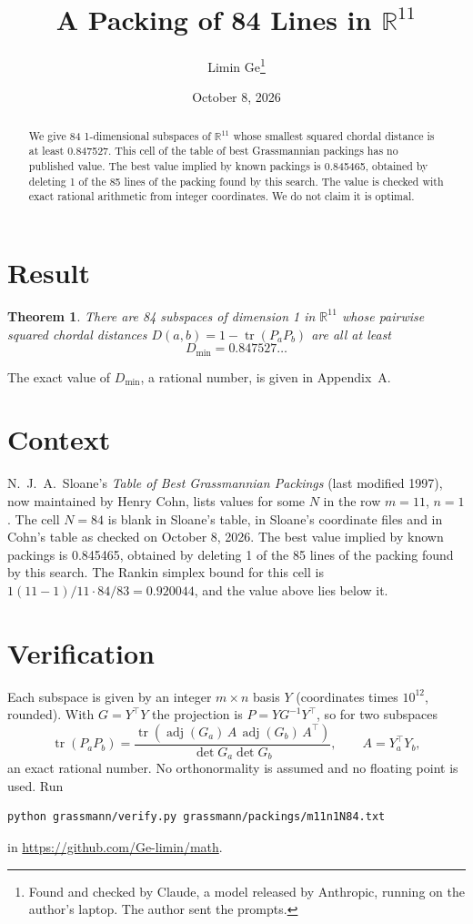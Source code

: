 \documentclass[11pt,a4paper]{article}
\title{A Packing of 84 Lines in $\mathbb{R}^{11}$}
\author{Limin Ge\thanks{Found and checked by Claude, a model released by Anthropic, running on the author's laptop. The author sent the prompts.}}
\date{October 8, 2026}
\newtheorem*{theorem}{Theorem}
\begin{document}
\maketitle
\begin{abstract}
We give 84 1-dimensional subspaces of $\mathbb{R}^{11}$ whose smallest squared chordal distance is at least 0.847527. This cell of the table of best Grassmannian packings has no published value. The best value implied by known packings is 0.845465, obtained by deleting 1 of the 85 lines of the packing found by this search. The value is checked with exact rational arithmetic from integer coordinates. We do not claim it is optimal.
\end{abstract}

\section{Result}
\begin{theorem}
There are 84 subspaces of dimension 1 in $\mathbb{R}^{11}$ whose pairwise squared chordal distances $D(a,b) = 1 - \operatorname{tr}(P_aP_b)$ are all at least
\[ D_{\min} = 0.847527\ldots \]
\end{theorem}
The exact value of $D_{\min}$, a rational number, is given in Appendix~A.


\section{Context}
N.~J.~A.~Sloane's \emph{Table of Best Grassmannian Packings} (last modified 1997), now maintained by Henry Cohn, lists values for some $N$ in the row $m=11$, $n=1$. The cell $N=84$ is blank in Sloane's table, in Sloane's coordinate files and in Cohn's table as checked on October 8, 2026. The best value implied by known packings is 0.845465, obtained by deleting 1 of the 85 lines of the packing found by this search. The Rankin simplex bound for this cell is $1(11-1)/11\cdot 84/83 = 0.920044$, and the value above lies below it.


\section{Verification}
Each subspace is given by an integer $m\times n$ basis $Y$ (coordinates times $10^{12}$, rounded). With $G=Y^\top Y$ the projection is $P=YG^{-1}Y^\top$, so for two subspaces
\[ \operatorname{tr}(P_aP_b)=\frac{\operatorname{tr}(\operatorname{adj}(G_a)\,A\,\operatorname{adj}(G_b)\,A^\top)}{\det G_a\det G_b},\qquad A=Y_a^\top Y_b, \]
an exact rational number. No orthonormality is assumed and no floating point is used. Run
\begin{verbatim}
python grassmann/verify.py grassmann/packings/m11n1N84.txt
\end{verbatim}
in \url{https://github.com/Ge-limin/math}.
\end{document}
